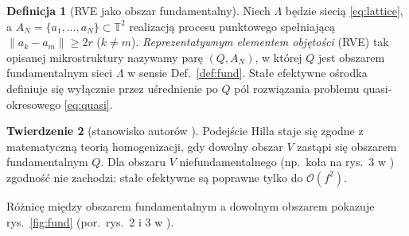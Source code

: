 \documentclass[12pt,a4paper,twoside,openright]{report}
\theoremstyle{definition}
\newtheorem{definicja}{Definicja}[chapter]
\newtheorem{twierdzenie}[definicja]{Twierdzenie}
\theoremstyle{remark}
\newcommand{\T}{\mathbb{T}}
\begin{document}
\begin{definicja}[RVE jako obszar fundamentalny]\label{def:rve}
Niech $\Lambda$ będzie siecią \eqref{eq:lattice}, a $A_N=\{a_1,\dots,a_N\}\subset\T^2$ realizacją procesu punktowego spełniającą $\|a_k-a_m\|\ge2r$ ($k\ne m$). \emph{Reprezentatywnym elementem objętości} (RVE) tak opisanej mikrostruktury nazywamy parę $(Q,A_N)$, w której $Q$ jest obszarem fundamentalnym sieci $\Lambda$ w sensie Def.~\ref{def:fund}. Stałe efektywne ośrodka definiuje się wyłącznie przez uśrednienie po $Q$ pól rozwiązania problemu quasi-okresowego \eqref{eq:quasi}.
\end{definicja}

\begin{twierdzenie}[stanowisko autorów \cite{czapla2025computational}]
Podejście Hilla staje się zgodne z matematyczną teorią homogenizacji, gdy dowolny obszar $V$ zastąpi się obszarem fundamentalnym $Q$. Dla obszaru $V$ niefundamentalnego (np.\ koła na rys.~3 w \cite{czapla2025computational}) zgodność nie zachodzi: stałe efektywne są poprawne tylko do $\mathcal O(f^2)$.
\end{twierdzenie}

Różnicę między obszarem fundamentalnym a dowolnym obszarem pokazuje rys.~\ref{fig:fund} (por.\ rys.~2 i 3 w \cite{czapla2025computational}).
\end{document}
